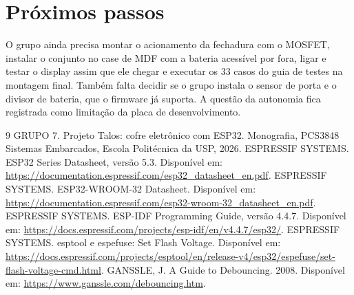 \documentclass[11pt,a4paper]{article}
\begin{document}
\section{Próximos passos}

O grupo ainda precisa montar o acionamento da fechadura com o MOSFET, instalar o conjunto no case de MDF com a bateria acessível por fora, ligar e testar o display assim que ele chegar e executar os 33 casos do guia de testes na montagem final. Também falta decidir se o grupo instala o sensor de porta e o divisor de bateria, que o firmware já suporta. A questão da autonomia fica registrada como limitação da placa de desenvolvimento.

\begin{thebibliography}{9}
 GRUPO 7. Projeto Talos: cofre eletrônico com ESP32. Monografia, PCS3848 Sistemas Embarcados, Escola Politécnica da USP, 2026.
 ESPRESSIF SYSTEMS. ESP32 Series Datasheet, versão 5.3. Disponível em: \url{https://documentation.espressif.com/esp32_datasheet_en.pdf}.
 ESPRESSIF SYSTEMS. ESP32-WROOM-32 Datasheet. Disponível em: \url{https://documentation.espressif.com/esp32-wroom-32_datasheet_en.pdf}.
 ESPRESSIF SYSTEMS. ESP-IDF Programming Guide, versão 4.4.7. Disponível em: \url{https://docs.espressif.com/projects/esp-idf/en/v4.4.7/esp32/}.
 ESPRESSIF SYSTEMS. esptool e espefuse: Set Flash Voltage. Disponível em: \url{https://docs.espressif.com/projects/esptool/en/release-v4/esp32/espefuse/set-flash-voltage-cmd.html}.
 GANSSLE, J. A Guide to Debouncing. 2008. Disponível em: \url{https://www.ganssle.com/debouncing.htm}.
\end{thebibliography}
\end{document}
